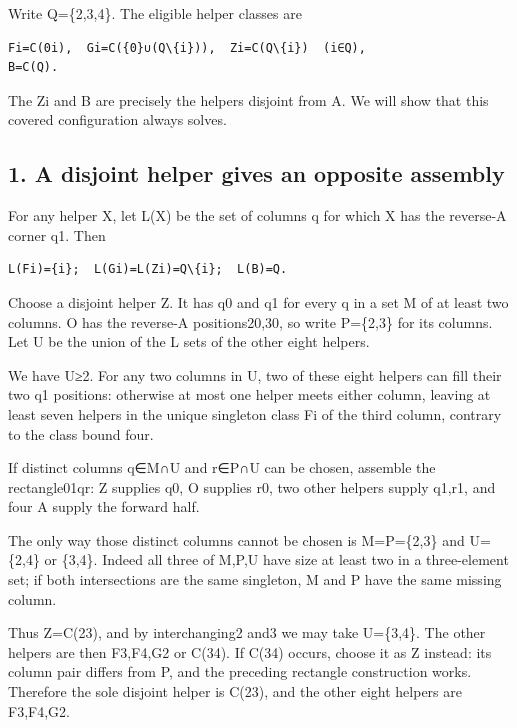 \documentclass[
  10pt,
]{article}
\begin{document}
Write Q=\{2,3,4\}. The eligible helper classes are

\begin{verbatim}
Fi=C(0i),  Gi=C({0}∪(Q\{i})),  Zi=C(Q\{i})  (i∈Q),
B=C(Q).
\end{verbatim}

The Zi and B are precisely the helpers disjoint from A. We will show
that this covered configuration always solves.

\hypertarget{a-disjoint-helper-gives-an-opposite-assembly}{%
\subsection*{1. A disjoint helper gives an opposite
assembly}\label{a-disjoint-helper-gives-an-opposite-assembly}}

For any helper X, let L(X) be the set of columns q for which X has the
reverse-A corner q1. Then

\begin{verbatim}
L(Fi)={i};  L(Gi)=L(Zi)=Q\{i};  L(B)=Q.
\end{verbatim}

Choose a disjoint helper Z. It has q0 and q1 for every q in a set M of
at least two columns. O has the reverse-A positions20,30, so write
P=\{2,3\} for its columns. Let U be the union of the L sets of the other
eight helpers.

We have \textbar U\textbar≥2. For any two columns in U, two of these
eight helpers can fill their two q1 positions: otherwise at most one
helper meets either column, leaving at least seven helpers in the unique
singleton class Fi of the third column, contrary to the class bound
four.

If distinct columns q∈M∩U and r∈P∩U can be chosen, assemble the
rectangle01\textbar qr: Z supplies q0, O supplies r0, two other helpers
supply q1,r1, and four A supply the forward half.

The only way those distinct columns cannot be chosen is M=P=\{2,3\} and
U=\{2,4\} or \{3,4\}. Indeed all three of M,P,U have size at least two
in a three-element set; if both intersections are the same singleton, M
and P have the same missing column.

Thus Z=C(23), and by interchanging2 and3 we may take U=\{3,4\}. The
other helpers are then F3,F4,G2 or C(34). If C(34) occurs, choose it as
Z instead: its column pair differs from P, and the preceding rectangle
construction works. Therefore the sole disjoint helper is C(23), and the
other eight helpers are F3,F4,G2.
\end{document}

